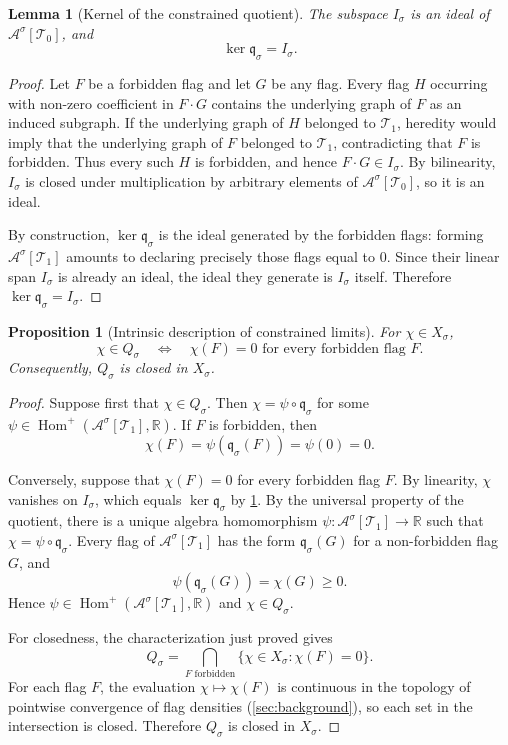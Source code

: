 \documentclass[11pt]{article}
\newtheorem{lemma}[lemma]{Lemma}
\newtheorem{proposition}[proposition]{Proposition}
\theoremstyle{definition}
\newcommand{\R}{\mathbb{R}}
\newcommand{\A}{\mathcal{A}}
\newcommand{\T}{\mathcal{T}}
\newcommand{\Homp}{\operatorname{Hom}^{+}}
\newcommand{\qmap}{\mathfrak q}
\begin{document}
\begin{lemma}[Kernel of the constrained quotient]\label{lem:forbidden-kernel}
The subspace $I_\sigma$ is an ideal of $\A^\sigma[\T_0]$, and
\[
  \ker\qmap_\sigma=I_\sigma.
\]
\end{lemma}

\begin{proof}
Let $F$ be a forbidden flag and let $G$ be any flag.  Every flag $H$ occurring with
non-zero coefficient in $F\cdot G$ contains the underlying graph of $F$ as an induced
subgraph.  If the underlying graph of $H$ belonged to $\T_1$, heredity would imply that
the underlying graph of $F$ belonged to $\T_1$, contradicting that $F$ is forbidden.
Thus every such $H$ is forbidden, and hence $F\cdot G\in I_\sigma$.  By bilinearity,
$I_\sigma$ is closed under multiplication by arbitrary elements of
$\A^\sigma[\T_0]$, so it is an ideal.

By construction, $\ker\qmap_\sigma$ is the ideal generated by the forbidden flags: forming
$\A^\sigma[\T_1]$ amounts to declaring precisely those flags equal to $0$.  Since their
linear span $I_\sigma$ is already an ideal, the ideal they generate is $I_\sigma$ itself.
Therefore $\ker\qmap_\sigma=I_\sigma$.
\end{proof}

\begin{proposition}[Intrinsic description of constrained limits]
\label{prop:constrained-intrinsic}
For $\chi\in X_\sigma$,
\[
  \chi\in Q_\sigma
  \quad\Longleftrightarrow\quad
  \chi(F)=0\text{ for every forbidden flag }F.
\]
Consequently, $Q_\sigma$ is closed in $X_\sigma$.
\end{proposition}

\begin{proof}
Suppose first that $\chi\in Q_\sigma$.  Then $\chi=\psi\circ\qmap_\sigma$ for some
$\psi\in\Homp(\A^\sigma[\T_1],\R)$.  If $F$ is forbidden, then
\[
  \chi(F)=\psi(\qmap_\sigma(F))=\psi(0)=0.
\]

Conversely, suppose that $\chi(F)=0$ for every forbidden flag $F$.  By linearity, $\chi$
vanishes on $I_\sigma$, which equals $\ker\qmap_\sigma$ by
\cref{lem:forbidden-kernel}.  By the universal property of the quotient, there is a unique
algebra homomorphism $\psi:\A^\sigma[\T_1]\to\R$ such that
$\chi=\psi\circ\qmap_\sigma$.  Every flag of $\A^\sigma[\T_1]$ has the form
$\qmap_\sigma(G)$ for a non-forbidden flag $G$, and
\[
  \psi(\qmap_\sigma(G))=\chi(G)\ge0.
\]
Hence $\psi\in\Homp(\A^\sigma[\T_1],\R)$ and $\chi\in Q_\sigma$.

For closedness, the characterization just proved gives
\[
  Q_\sigma
  =
  \bigcap_{F\text{ forbidden}}
  \{\chi\in X_\sigma:\chi(F)=0\}.
\]
For each flag $F$, the evaluation $\chi\mapsto\chi(F)$ is continuous in the topology of
pointwise convergence of flag densities (\cref{sec:background}), so each set in the
intersection is closed.  Therefore $Q_\sigma$ is closed in $X_\sigma$.
\end{proof}
\end{document}
